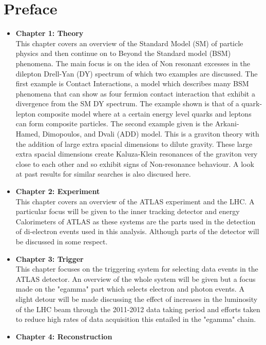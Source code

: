 \chapter*{Preface}

\begin{itemize}

\item{ 
{\bf Chapter 1: Theory} \\
This chapter covers an overview of the Standard Model (SM) of particle physics and then continue on to Beyond the Standard model (BSM) phenomena. The main focus is on the idea of Non resonant excesses in the dilepton Drell-Yan (DY) spectrum of which two examples are discussed. The first example is Contact Interactions, a model which describes many BSM phenomena that can show as four fermion contact interaction that exhibit a divergence from the SM DY spectrum. The example shown is that of a quark-lepton composite model where at a certain energy level quarks and leptons can form composite particles. The second example given is the Arkani-Hamed, Dimopoulos, and Dvali (ADD) model. This is a graviton theory with the addition of large extra spacial dimensions to dilute gravity. These large extra spacial dimensions create Kaluza-Klein resonances of the graviton very close to each other and so exhibit signs of Non-resonance behaviour. A look at past results for similar searches is also discused here.
}
\item{ 
{\bf Chapter 2: Experiment} \\
This chapter covers an overview of the ATLAS experiment and the LHC. A particular focus will be given to the inner tracking detector and energy Calorimeters of ATLAS as these systems are the parts used in the detection of di-electron events used in this analysis. Although parts of the detector will be discussed in some respect.
}
\item{ 
{\bf Chapter 3: Trigger} \\
This chapter focuses on the triggering system for selecting data events in the ATLAS detector. An overview of the whole system will be given but a focus made on the "egamma" part which selects electron and photon events. A slight detour will be made discussing the effect of increases in the luminosity of the LHC beam through the 2011-2012 data taking period and efforts taken to reduce high rates of data acquisition this entailed in the "egamma" chain.
}
\item{ 
{\bf Chapter 4: Reconstruction} \\
}
\end{itemize}
